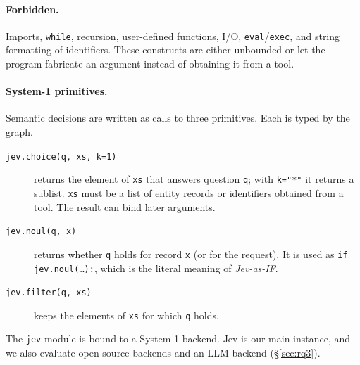 \paragraph{Forbidden.} Imports, \texttt{while}, recursion, user-defined functions, I/O, \texttt{eval}/\texttt{exec}, and string formatting of identifiers. These constructs are either unbounded or let the program fabricate an argument instead of obtaining it from a tool.

\paragraph{System-1 primitives.} Semantic decisions are written as calls to three primitives. Each is typed by the graph.
\begin{description}
  \item[{\texttt{jev.choice(q, xs, k=1)}}] returns the element of \texttt{xs} that answers question \texttt{q}; with \texttt{k="*"} it returns a sublist. \texttt{xs} must be a list of entity records or identifiers obtained from a tool. The result can bind later arguments.
  \item[{\texttt{jev.noul(q, x)}}] returns whether \texttt{q} holds for record \texttt{x} (or for the request). It is used as \texttt{if jev.noul(\ldots):}, which is the literal meaning of \emph{Jev-as-IF}.
  \item[{\texttt{jev.filter(q, xs)}}] keeps the elements of \texttt{xs} for which \texttt{q} holds.
\end{description}
The \texttt{jev} module is bound to a System-1 backend. Jev is our main instance, and we also evaluate open-source backends and an LLM backend (\S\ref{sec:rq3}).

